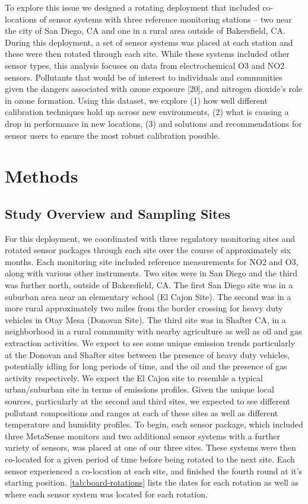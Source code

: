 \documentclass[journal abbreviation, manuscript]{copernicus}
\begin{document}
To explore this issue we designed a rotating deployment that included co-locations of sensor systems with three reference monitoring stations – two near the city of San Diego, CA and one in a rural area outside of Bakersfield, CA. During this deployment, a set of sensor systems was placed at each station and these were then rotated through each site. While these systems included other sensor types, this analysis focuses on data from electrochemical O3 and NO2 sensors. Pollutants that would be of interest to individuals and communities given the dangers associated with ozone exposure [20], and nitrogen dioxide’s role in ozone formation. Using this dataset, we explore (1) how well different calibration techniques hold up across new environments, (2) what is causing a drop in performance in new locations, (3) and solutions and recommendations for sensor users to ensure the most robust calibration possible. 

\section{Methods}

\subsection{Study Overview and Sampling Sites}
For this deployment, we coordinated with three regulatory monitoring sites and rotated sensor packages through each site over the course of approximately six months. Each monitoring site included reference measurements for NO2 and O3, along with various other instruments. Two sites were in San Diego and the third was further north, outside of Bakersfield, CA. The first San Diego site was in a suburban area near an elementary school (El Cajon Site). The second was in a more rural approximately two miles from the border crossing for heavy duty vehicles in Otay Mesa (Donovan Site). The third site was in Shafter CA, in a neighborhood in a rural community with nearby agriculture as well as oil and gas extraction activities. We expect to see some unique emission trends particularly at the Donovan and Shafter sites between the presence of heavy duty vehicles, potentially idling for long periods of time, and the oil and the presence of gas activity respectively. We expect the El Cajon site to resemble a typical urban/suburban site in terms of emissions profiles.  Given the unique local sources, particularly at the second and third sites, we expected to see different pollutant compositions and ranges at each of these sites as well as different temperature and humidity profiles. 
To begin, each sensor package, which included three MetaSense monitors and two additional sensor systems with a further variety of sensors, was placed at one of our three sites. These systems were then co-located for a given period of time before being rotated to the next site. Each sensor experienced a co-location at each site, and finished the fourth round at it’s starting position. \autoref{tab:board-rotations} lists the dates for each rotation as well as where each sensor system was located for each rotation. 
\end{document}
